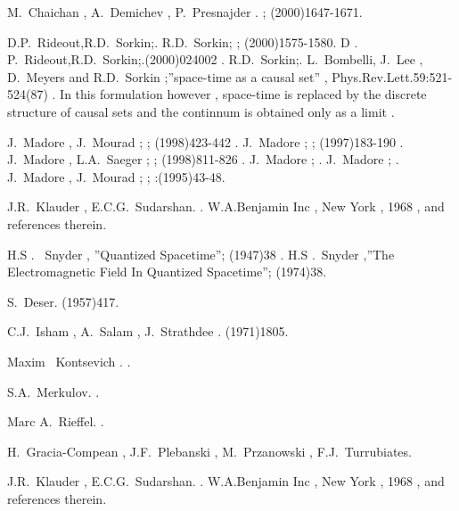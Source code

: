 \documentclass[a4paper,12pt]{article}
\begin{document}
\begin{thebibliography}{10}
M.~Chaichan , A.~Demichev , P.~Presnajder .
;
(2000)1647-1671.

D.P.~Rideout,R.D.~Sorkin;.
R.D.~Sorkin; ; (2000)1575-1580. D .
P.~Rideout,R.D.~Sorkin;.(2000)024002 . R.D.~Sorkin;. L.~Bombelli, J.~Lee
, D.~Meyers and R.D.~Sorkin ;''space-time as a causal set'' , Phys.Rev.Lett.59:521-524(87) . In this formulation however , space-time is replaced by the discrete
structure of causal sets and the continnum is obtained only as a
limit .

J.~Madore , J.~Mourad ;  ;
(1998)423-442 . J.~Madore ;
 ; (1997)183-190 . J.~Madore ,
L.A.~Saeger ;  ; (1998)811-826 . J.~Madore ;
. J.~Madore ; . J.~Madore , J.~Mourad ;  ;
:(1995)43-48.

J.R.~Klauder , E.C.G.~Sudarshan.
.
\newblock W.A.Benjamin Inc , New York , 1968 , and references
therein.

H.S . ~Snyder , ''Quantized Spacetime'';
 (1947)38 .
H.S .~Snyder ,''The Electromagnetic Field In Quantized Spacetime'';
 (1974)38.

S.~Deser.
(1957)417.

C.J.~Isham , A.~Salam , J.~Strathdee . 
(1971)1805.


Maxim ~Kontsevich .
.

S.A.~Merkulov.
.

Marc A.~Rieffel.
.

H.~Gracia-Compean , J.F.~Plebanski , M.~Przanowski ,
F.J.~Turrubiates.



J.R.~Klauder , E.C.G.~Sudarshan.
.
\newblock W.A.Benjamin Inc , New York , 1968 , and references
therein.

\end{thebibliography}
\end{document}
